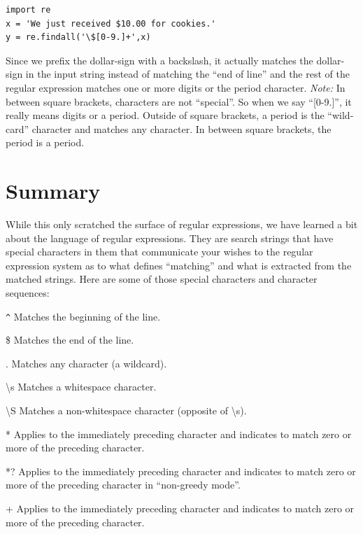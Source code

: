 \documentclass[10pt]{book}
\begin{document}
\beforeverb
\begin{verbatim}
import re
x = 'We just received $10.00 for cookies.'
y = re.findall('\$[0-9.]+',x)
\end{verbatim}
\afterverb
%
Since we prefix the dollar-sign with a backslash, it actually matches the dollar-sign
in the input string instead of matching the ``end of line'' and the rest of the regular
expression matches one or more digits or the period character.  {\em Note:} In between 
square brackets, characters are not ``special''.   So when we say ``[0-9.]'', it really 
means digits or a period.    Outside of square brackets, a period is the ``wild-card'' 
character and matches any character.  In between square brackets, the period is a period.

\section{Summary}

While this only scratched the surface of regular expressions, we have learned a bit about the language of regular expressions.  They are search strings that have special characters in them that communicate your wishes to the regular expression system as to what defines ``matching'' and what is extracted from the matched strings.  Here are some of those special characters and character sequences:

\verb"^" \newline
Matches the beginning of the line.

\$ \newline
Matches the end of the line.

. \newline
Matches any character (a wildcard).

{\textbackslash}s \newline
Matches a whitespace character.

{\textbackslash}S \newline
Matches a non-whitespace character (opposite of {\textbackslash}s).

* \newline
Applies to the immediately preceding character and indicates to match zero or more of the preceding character.

*? \newline
Applies to the immediately preceding character and indicates to match zero or more of the preceding character in ``non-greedy mode''.

+ \newline
Applies to the immediately preceding character and indicates to match zero or more of the preceding character.
\end{document}
